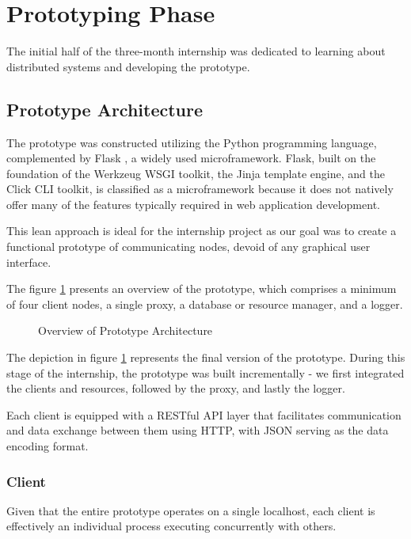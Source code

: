 \section{Prototyping Phase}

The initial half of the three-month internship was dedicated to learning about distributed systems and developing the prototype.

\subsection{Prototype Architecture}

The prototype was constructed utilizing the Python programming language, complemented by Flask \cite{flask}, a widely used microframework. Flask, built on the foundation of the Werkzeug WSGI toolkit, the Jinja template engine, and the Click CLI toolkit, is classified as a microframework because it does not natively offer many of the features typically required in web application development. 

This lean approach is ideal for the internship project as our goal was to create a functional prototype of communicating nodes, devoid of any graphical user interface.

The figure \ref{fig:prototype_architecture} presents an overview of the prototype, which comprises a minimum of four client nodes, a single proxy, a database or resource manager, and a logger.

\begin{figure}[htbp]
  \centering
   
  \caption{Overview of Prototype Architecture}
  \label{fig:prototype_architecture}
\end{figure}

The depiction in figure \ref{fig:prototype_architecture} represents the final version of the prototype. During this stage of the internship, the prototype was built incrementally - we first integrated the clients and resources, followed by the proxy, and lastly the logger.

Each client is equipped with a RESTful API layer that facilitates communication and data exchange between them using HTTP, with JSON serving as the data encoding format.

\subsubsection{Client}

Given that the entire prototype operates on a single localhost, each client is effectively an individual process executing concurrently with others.

